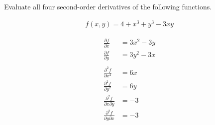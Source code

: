 Evaluate all four second-order derivatives of the following functions.

\begin{align*}
    f(x, y) = 4 + x^3 + y^3 - 3xy
\end{align*}

\begin{solution}
\begin{align*}
    \frac{\partial f}{\partial x} &= 3x^2 - 3y \\
    \frac{\partial f}{\partial y} &= 3y^2 - 3x \\
    \\
    \frac{\partial^2 f}{\partial x^2} &= 6x \\
    \frac{\partial^2 f}{\partial y^2} &= 6y \\
    \frac{\partial^2 f}{\partial x \partial y} &= -3 \\
    \frac{\partial^2 f}{\partial y \partial x} &= -3 \\
\end{align*}
\end{solution}